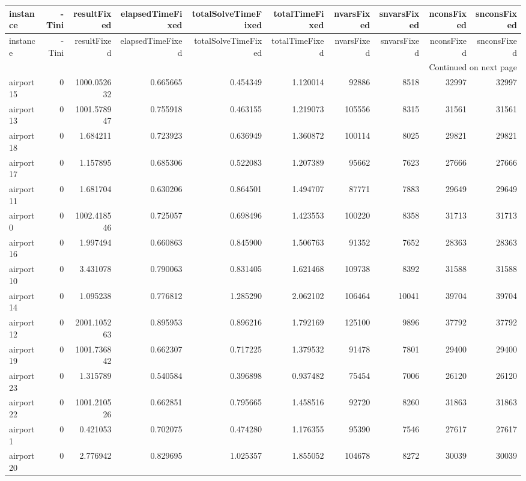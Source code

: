 
\begin{longtable}{|l|r|r|r|r|r|r|r|r|r|}
\toprule
instance & -Tini & resultFixed & elapsedTimeFixed & totalSolveTimeFixed & totalTimeFixed & nvarsFixed & snvarsFixed & nconsFixed & snconsFixed \\
\midrule
\endfirsthead
\toprule
instance & -Tini & resultFixed & elapsedTimeFixed & totalSolveTimeFixed & totalTimeFixed & nvarsFixed & snvarsFixed & nconsFixed & snconsFixed \\
\midrule
\endhead
\midrule
\multicolumn{10}{r}{Continued on next page} \\
\midrule
\endfoot
\bottomrule
\endlastfoot
airport15 & 0 & 1000.052632 & 0.665665 & 0.454349 & 1.120014 & 92886 & 8518 & 32997 & 32997 \\
airport13 & 0 & 1001.578947 & 0.755918 & 0.463155 & 1.219073 & 105556 & 8315 & 31561 & 31561 \\
airport18 & 0 & 1.684211 & 0.723923 & 0.636949 & 1.360872 & 100114 & 8025 & 29821 & 29821 \\
airport17 & 0 & 1.157895 & 0.685306 & 0.522083 & 1.207389 & 95662 & 7623 & 27666 & 27666 \\
airport11 & 0 & 1.681704 & 0.630206 & 0.864501 & 1.494707 & 87771 & 7883 & 29649 & 29649 \\
airport0 & 0 & 1002.418546 & 0.725057 & 0.698496 & 1.423553 & 100220 & 8358 & 31713 & 31713 \\
airport16 & 0 & 1.997494 & 0.660863 & 0.845900 & 1.506763 & 91352 & 7652 & 28363 & 28363 \\
airport10 & 0 & 3.431078 & 0.790063 & 0.831405 & 1.621468 & 109738 & 8392 & 31588 & 31588 \\
airport14 & 0 & 1.095238 & 0.776812 & 1.285290 & 2.062102 & 106464 & 10041 & 39704 & 39704 \\
airport12 & 0 & 2001.105263 & 0.895953 & 0.896216 & 1.792169 & 125100 & 9896 & 37792 & 37792 \\
airport19 & 0 & 1001.736842 & 0.662307 & 0.717225 & 1.379532 & 91478 & 7801 & 29400 & 29400 \\
airport23 & 0 & 1.315789 & 0.540584 & 0.396898 & 0.937482 & 75454 & 7006 & 26120 & 26120 \\
airport22 & 0 & 1001.210526 & 0.662851 & 0.795665 & 1.458516 & 92720 & 8260 & 31863 & 31863 \\
airport1 & 0 & 0.421053 & 0.702075 & 0.474280 & 1.176355 & 95390 & 7546 & 27617 & 27617 \\
airport20 & 0 & 2.776942 & 0.829695 & 1.025357 & 1.855052 & 104678 & 8272 & 30039 & 30039 \\

\end{longtable}
